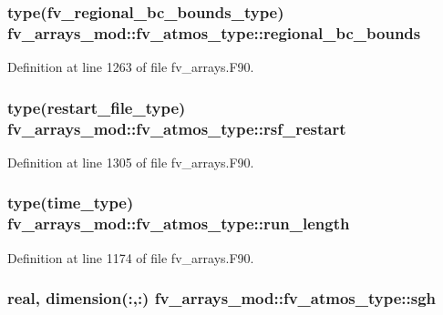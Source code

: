 \subsubsection[{regional\-\_\-bc\-\_\-bounds}]{\setlength{\rightskip}{0pt plus 5cm}type({\bf fv\-\_\-regional\-\_\-bc\-\_\-bounds\-\_\-type}) fv\-\_\-arrays\-\_\-mod\-::fv\-\_\-atmos\-\_\-type\-::regional\-\_\-bc\-\_\-bounds}\label{structfv__arrays__mod_1_1fv__atmos__type_a685f2987cb3a2f50f28a8ed8b58ce6e6}


Definition at line 1263 of file fv\-\_\-arrays.\-F90.

\subsubsection[{rsf\-\_\-restart}]{\setlength{\rightskip}{0pt plus 5cm}type(restart\-\_\-file\-\_\-type) fv\-\_\-arrays\-\_\-mod\-::fv\-\_\-atmos\-\_\-type\-::rsf\-\_\-restart}\label{structfv__arrays__mod_1_1fv__atmos__type_a3d76489d7309fe00ff9417911e8d3fb5}


Definition at line 1305 of file fv\-\_\-arrays.\-F90.

\subsubsection[{run\-\_\-length}]{\setlength{\rightskip}{0pt plus 5cm}type(time\-\_\-type) fv\-\_\-arrays\-\_\-mod\-::fv\-\_\-atmos\-\_\-type\-::run\-\_\-length}\label{structfv__arrays__mod_1_1fv__atmos__type_ad7f9725ebc9ed275affe742ae6384720}


Definition at line 1174 of file fv\-\_\-arrays.\-F90.

\subsubsection[{sgh}]{\setlength{\rightskip}{0pt plus 5cm}real, dimension(\-:,\-:) fv\-\_\-arrays\-\_\-mod\-::fv\-\_\-atmos\-\_\-type\-::sgh}\label{structfv__arrays__mod_1_1fv__atmos__type_ad6a036d45fbee5ca39120b204a0a78c3}


